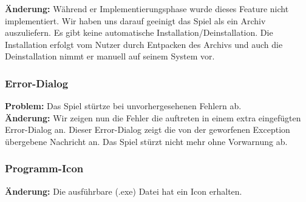 \textbf{Änderung:} Während er Implementierungsphase wurde dieses Feature nicht implementiert. Wir haben uns darauf geeinigt das Spiel als ein Archiv auszuliefern. Es gibt keine automatische Installation/Deinstallation. Die Installation erfolgt vom Nutzer durch Entpacken des Archivs und auch die Deinstallation nimmt er manuell auf seinem System vor.\\


\subsubsection*{Error-Dialog}
\textbf{Problem:} Das Spiel stürtze bei unvorhergesehenen Fehlern ab.\\

\textbf{Änderung:} Wir zeigen nun die Fehler die auftreten in einem extra eingefügten Error-Dialog an. Dieser Error-Dialog zeigt die von der geworfenen Exception übergebene Nachricht an. Das Spiel stürzt nicht mehr ohne Vorwarnung ab.\\



\subsubsection*{Programm-Icon}

\textbf{Änderung:} Die ausführbare (.exe) Datei hat ein Icon erhalten.\\
